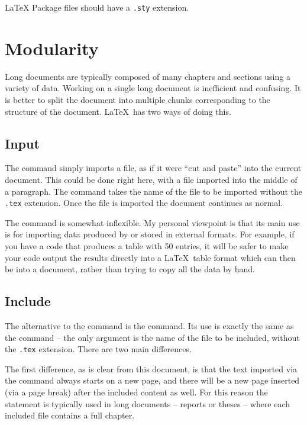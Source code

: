 \begin{chapter}{\LaTeX}
Package files should have a \verb|.sty| extension.

\section{Modularity}
\label{sec:modularity}

Long documents are typically composed of many chapters and sections using a variety of data. Working on a single long document is inefficient and confusing. It is better to split the document into multiple chunks corresponding to the structure of the document. \LaTeX\ has two ways of doing this.

\subsection{Input}
\label{sec:modularity_input}

The command \verb|| simply imports a file, as if it were ``cut and paste'' into the current document. This could be done right here, with a file imported into the middle of a paragraph. The \verb|| command takes the name of the file to be imported without the \texttt{.tex} extension. Once the file is imported the document continues as normal.

The \verb|| command is somewhat inflexible. My personal viewpoint is that its main use is for importing data produced by or stored in external formats. For example, if you have a code that produces a table with 50 entries, it will be safer to make your code output the results directly into a \LaTeX\ table format which can then be \verb|| into a document, rather than trying to copy all the data by hand.

\subsection{Include}
\label{sec:modularity_include}

The alternative to the \verb|| command is the \verb|| command. Its use is exactly the same as the \verb|| command -- the only argument is the name of the file to be included, without the \texttt{.tex} extension. There are two main differences.

The first difference, as is clear from this document, is that the text imported via the \verb|| command always starts on a new page, and there will be a new page inserted (via a page break) after the included content as well. For this reason the \verb|| statement is typically used in long documents -- reports or theses -- where each included file contains a full chapter.


\end{chapter}

